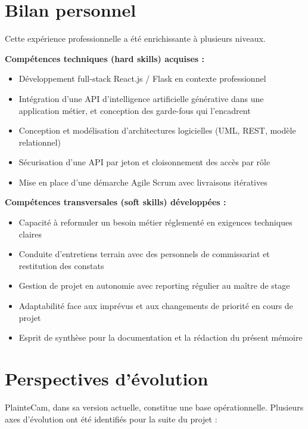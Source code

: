 \section*{Bilan personnel}

Cette expérience professionnelle a été enrichissante à plusieurs niveaux.

\textbf{Compétences techniques (hard skills) acquises :}
\begin{itemize}
    \item Développement full-stack React.js / Flask en contexte professionnel
    \item Intégration d'une API d'intelligence artificielle générative dans une application métier, et conception des garde-fous qui l'encadrent
    \item Conception et modélisation d'architectures logicielles (UML, REST, modèle relationnel)
    \item Sécurisation d'une API par jeton et cloisonnement des accès par rôle
    \item Mise en place d'une démarche Agile Scrum avec livraisons itératives
\end{itemize}

\textbf{Compétences transversales (soft skills) développées :}
\begin{itemize}
    \item Capacité à reformuler un besoin métier réglementé en exigences techniques claires
    \item Conduite d'entretiens terrain avec des personnels de commissariat et restitution des constats
    \item Gestion de projet en autonomie avec reporting régulier au maître de stage
    \item Adaptabilité face aux imprévus et aux changements de priorité en cours de projet
    \item Esprit de synthèse pour la documentation et la rédaction du présent mémoire
\end{itemize}

\section*{Perspectives d'évolution}

PlainteCam, dans sa version actuelle, constitue une base opérationnelle. Plusieurs axes d'évolution ont été identifiés pour la suite du projet :

